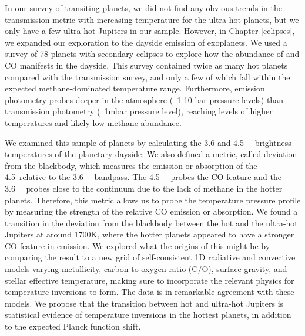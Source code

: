 In our survey of transiting planets, we did not find any obvious trends in the transmission metric with increasing temperature for the ultra-hot planets, but we only have a few ultra-hot Jupiters in our sample. However, in Chapter \ref{eclipses}, we expanded our exploration to the dayside emission of exoplanets. We used a survey of 78 planets with secondary eclipses to explore how the abundance of  and CO manifests in the dayside. This survey contained twice as many hot planets compared with the transmission survey, and only a few of which fall within the expected methane-dominated temperature range. Furthermore, emission photometry probes deeper in the atmosphere (~1-10 bar pressure levels) than transmission photometry (~1mbar pressure level), reaching levels of higher temperatures and likely low methane abundance.

We examined this sample of planets by calculating the 3.6 and 4.5~\um~ brightness temperatures of the planetary dayside. We also defined a metric, called deviation from the blackbody, which measures the emission or absorption of the 4.5~\um relative to the 3.6~\um~ bandpass. The 4.5~\um~ probes the CO feature and the 3.6~\um~ probes close to the continuum due to the lack of methane in the hotter planets. Therefore, this metric allows us to probe the temperature pressure profile by measuring the strength of the relative CO emission or absorption. We found a transition in the deviation from the blackbody between the hot and the ultra-hot Jupiters at around 1700K, where the hotter planets appeared to have a stronger CO feature in emission. We explored what the origins of this might be by comparing the result to a new grid of self-consistent 1D radiative and convective models varying metallicity, carbon to oxygen ratio (C/O), surface gravity, and stellar effective temperature, making sure to incorporate the relevant physics for temperature inversions to form. The data is in remarkable agreement with these models. We propose that the transition between hot and ultra-hot Jupiters is statistical evidence of temperature inversions in the hottest planets, in addition to the expected Planck function shift.

